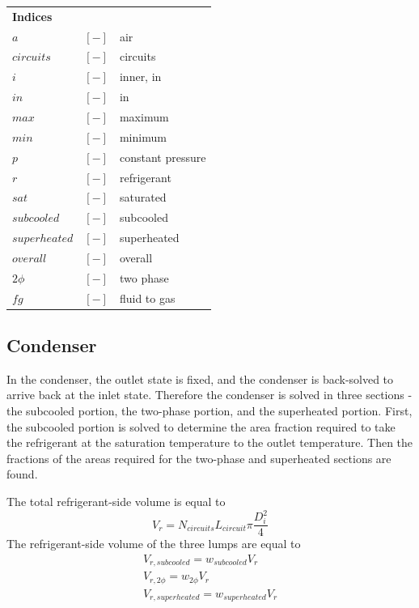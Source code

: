 \documentclass[]{article}
\begin{document}
\begin{longtable}{p{2cm} p{2cm} p{13cm}}
\textbf{\textsf{\large Indices}}\\
$a$ & $ \left[- \right] $ 		& air\\
$circuits$    & $ \left[- \right] $ 	& circuits\\
$i$    	& $ \left[- \right] $        	& inner, in\\
$in$    	& $ \left[- \right] $        	& in\\
$max$ & $ \left[- \right] $ 		& maximum\\
$min$	& $ \left[- \right] $ 		& minimum\\
$p$ & $ \left[- \right] $ 		& constant pressure\\
$r$    	& $ \left[- \right] $       	 	& refrigerant\\
$sat$ & $ \left[- \right] $ 		& saturated\\
$subcooled$    & $ \left[- \right] $        & subcooled\\
$superheated$ & $ \left[- \right] $ 		& superheated\\
$overall$ & $ \left[- \right] $ 		& overall\\
$2\phi$    & $ \left[- \right] $        & two phase\\
$fg$		   & $ \left[- \right] $        & fluid to gas\\	


\end{longtable}


\subsection{Condenser}


In the condenser, the outlet state is fixed, and the condenser is back-solved to arrive back at the inlet state.  Therefore the condenser is solved in three sections - the subcooled portion, the two-phase portion, and the superheated portion.  First, the subcooled portion is solved to determine the area fraction required to take the refrigerant at the saturation temperature to the outlet temperature.  Then the fractions of the areas required for the two-phase and superheated sections are found.

The total refrigerant-side volume is equal to
\begin{equation}
V_r=N_{circuits}L_{circuit}\pi \frac{D_i^2}{4}
\end{equation}
The refrigerant-side volume of the three lumps are equal to 
\begin{equation}
\begin{array}{c}
V_{r,subcooled}=w_{subcooled}V_r\\
V_{r,2\phi}=w_{2\phi}V_r\\
V_{r,superheated}=w_{superheated}V_r
\end{array}
\end{equation}
\end{document}
